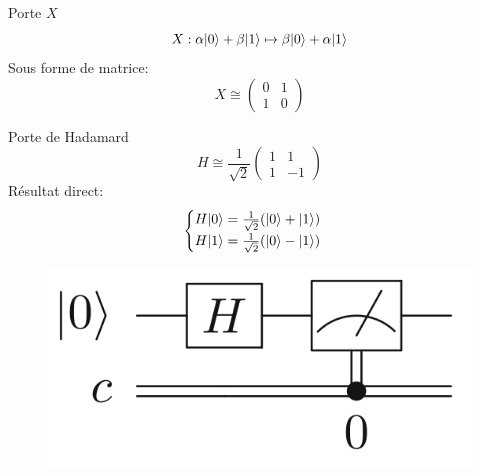 \documentclass[aspectratio=169]{beamer}
\theoremstyle{plain}
\theoremstyle{definition}
\DeclarePairedDelimiter\ket{\lvert}{\rangle}
\begin{document}
\begin{frame}{Porte $X$}
    \begin{equation*}
        X : \alpha\ket{0} + \beta\ket{1} \mapsto \beta\ket{0} + \alpha\ket{1}
    \end{equation*}
    Sous forme de matrice:
    \begin{equation*}
        X \cong \begin{pmatrix}
            0&1\\
            1&0
        \end{pmatrix}
    \end{equation*}
\end{frame}


\begin{frame}{Porte de Hadamard}
    \begin{equation*}
        H \cong \frac{1}{\sqrt{2}}
        \begin{pmatrix}
            1&1\\
            1&-1
        \end{pmatrix}
    \end{equation*}
    Résultat direct:
    \begin{equation*}
        \begin{cases}
            H\ket{0} = \frac{1}{\sqrt{2}}(\ket{0}+\ket{1}) \\
            H\ket{1} = \frac{1}{\sqrt{2}}(\ket{0}-\ket{1})
        \end{cases}
    \end{equation*}
    \begin{figure}
        \label{fig:basic-circuit}
        \centering
        \includegraphics[scale=0.3]{basic-circuit.png}
    \end{figure}
\end{frame}
\end{document}
